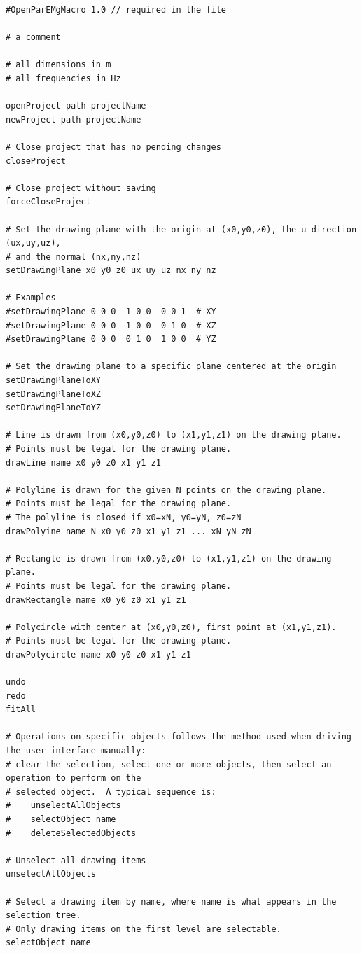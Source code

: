\documentclass[titlepage]{article}
\renewcommand\_{\textunderscore\linebreak[1]}
\begin{document}
\begin{Verbatim}[fontsize=\small]
#OpenParEMgMacro 1.0 // required in the file

# a comment

# all dimensions in m
# all frequencies in Hz

openProject path projectName
newProject path projectName

# Close project that has no pending changes
closeProject

# Close project without saving 
forceCloseProject

# Set the drawing plane with the origin at (x0,y0,z0), the u-direction (ux,uy,uz),
# and the normal (nx,ny,nz)
setDrawingPlane x0 y0 z0 ux uy uz nx ny nz

# Examples
#setDrawingPlane 0 0 0  1 0 0  0 0 1  # XY
#setDrawingPlane 0 0 0  1 0 0  0 1 0  # XZ
#setDrawingPlane 0 0 0  0 1 0  1 0 0  # YZ

# Set the drawing plane to a specific plane centered at the origin
setDrawingPlaneToXY
setDrawingPlaneToXZ
setDrawingPlaneToYZ

# Line is drawn from (x0,y0,z0) to (x1,y1,z1) on the drawing plane.
# Points must be legal for the drawing plane.
drawLine name x0 y0 z0 x1 y1 z1

# Polyline is drawn for the given N points on the drawing plane.
# Points must be legal for the drawing plane.
# The polyline is closed if x0=xN, y0=yN, z0=zN
drawPolyine name N x0 y0 z0 x1 y1 z1 ... xN yN zN

# Rectangle is drawn from (x0,y0,z0) to (x1,y1,z1) on the drawing plane.
# Points must be legal for the drawing plane.
drawRectangle name x0 y0 z0 x1 y1 z1

# Polycircle with center at (x0,y0,z0), first point at (x1,y1,z1).
# Points must be legal for the drawing plane.
drawPolycircle name x0 y0 z0 x1 y1 z1 

undo
redo
fitAll

# Operations on specific objects follows the method used when driving the user interface manually:
# clear the selection, select one or more objects, then select an operation to perform on the
# selected object.  A typical sequence is:
#    unselectAllObjects
#    selectObject name
#    deleteSelectedObjects

# Unselect all drawing items
unselectAllObjects

# Select a drawing item by name, where name is what appears in the selection tree.
# Only drawing items on the first level are selectable.
selectObject name


\end{Verbatim}
\end{document}
